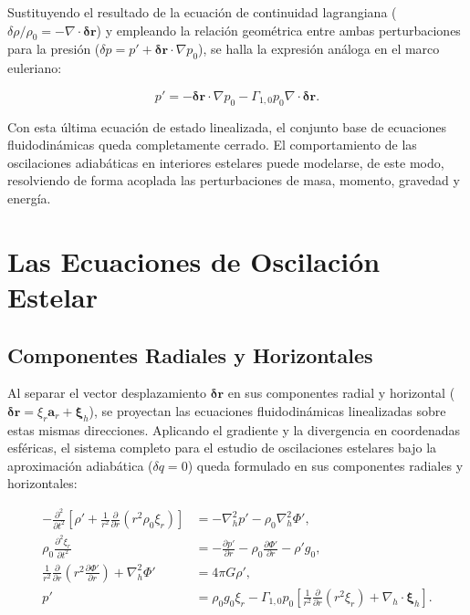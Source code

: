 Sustituyendo el resultado de la ecuación de continuidad lagrangiana ($ \delta \rho / \rho_0 = - \nabla \cdot \boldsymbol{\delta r} $) y empleando la relación geométrica entre ambas perturbaciones para la presión ($ \delta p = p' + \boldsymbol{\delta r} \cdot \nabla p_0 $), se halla la expresión análoga en el marco euleriano:

\begin{equation}
  p' = - \boldsymbol{\delta r} \cdot \nabla p_0 - \Gamma_{1,0} p_0 \nabla \cdot \boldsymbol{\delta r}.
\end{equation}

Con esta última ecuación de estado linealizada, el conjunto base de ecuaciones fluidodinámicas queda completamente cerrado. El comportamiento de las oscilaciones adiabáticas en interiores estelares puede modelarse, de este modo, resolviendo de forma acoplada las perturbaciones de masa, momento, gravedad y energía.

\section{Las Ecuaciones de Oscilación Estelar}

\subsection{Componentes Radiales y Horizontales}

Al separar el vector desplazamiento $\boldsymbol{\delta r}$ en sus componentes radial y horizontal ($\boldsymbol{\delta r} = \xi_r \mathbf{a}_r + \boldsymbol{\xi}_h$), se proyectan las ecuaciones fluidodinámicas linealizadas sobre estas mismas direcciones. Aplicando el gradiente y la divergencia en coordenadas esféricas, el sistema completo para el estudio de oscilaciones estelares bajo la aproximación adiabática ($\delta q = 0$) queda formulado en sus componentes radiales y horizontales:

\begin{align}
  -\frac{\partial^2}{\partial t^2} \left[ \rho' + \frac{1}{r^2} \frac{\partial}{\partial r} (r^2 \rho_0 \xi_r) \right] &= -\nabla_h^2 p' - \rho_0 \nabla_h^2 \Phi', \label{eq:oscilaciones_horizontal}\\
  \rho_0 \frac{\partial^2 \xi_r}{\partial t^2} &= - \frac{\partial p'}{\partial r} - \rho_0 \frac{\partial \Phi'}{\partial r} - \rho' g_0, \label{eq:oscilaciones_radial}\\
  \frac{1}{r^2} \frac{\partial}{\partial r} \left( r^2 \frac{\partial \Phi'}{\partial r} \right) + \nabla_h^2 \Phi' &= 4 \pi G \rho', \label{eq:poisson_oscillaciones}\\
  p' &= \rho_0 g_0 \xi_r - \Gamma_{1,0} p_0 \left[ \frac{1}{r^2} \frac{\partial}{\partial r} (r^2 \xi_r) + \nabla_h \cdot \boldsymbol{\xi}_h \right]. \label{eq:energia_adiabatica_gravedad}
\end{align}

